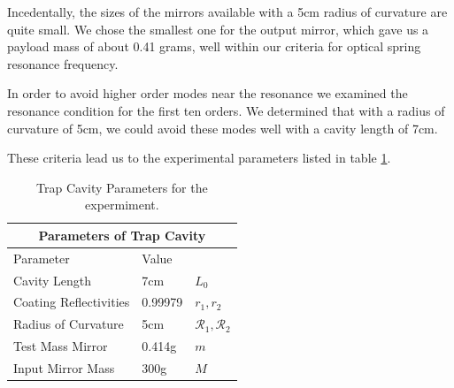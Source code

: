 Incedentally, the sizes of the mirrors available with a 5cm radius of curvature
are quite small.
We chose the smallest one for the output mirror, which gave us a payload mass of
about 0.41 grams, well within our criteria for optical spring resonance frequency.

In order to avoid higher order modes near the resonance we examined the resonance
condition for the first ten orders.
We determined that with a radius of curvature of 5cm, we could avoid these modes
well with a cavity length of 7cm.

These criteria lead us to the experimental parameters listed in table
\ref{tab:lintrap1}.





\begin{table}
\begin{center}
\begin{tabular}{|l|l|l|}
  \hline
  \multicolumn{3}{|c|}{Parameters of Trap Cavity} \\
  \hline
  \hline
  Parameter & Value & \\
  \hline
  Cavity Length & 7cm & $L_0$ \\
  Coating Reflectivities & 0.99979 & $r_1,r_2$ \\
  Radius of Curvature & 5cm & $\mathcal{R}_1,\mathcal{R}_2$ \\
  Test Mass Mirror & 0.414g & $m$ \\
  Input Mirror Mass & 300g & $M$ \\
  \hline
\end{tabular}
\end{center}
\caption[Trap Cavity Parameters]{Trap Cavity Parameters for the expermiment.}
\label{tab:lintrap1}
\end{table}


